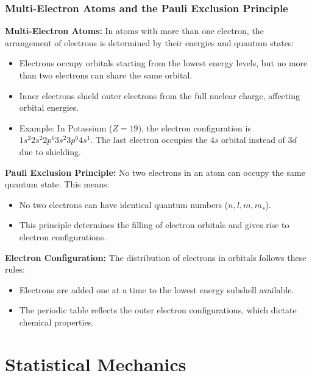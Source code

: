 \documentclass{article}
\newcommand{\conceptbox}[1]{\begin{tcolorbox}[colback=blue!10] #1 \end{tcolorbox}}
\begin{document}
\subsubsection{Multi-Electron Atoms and the Pauli Exclusion Principle}

\conceptbox{
\textbf{Multi-Electron Atoms:}
In atoms with more than one electron, the arrangement of electrons is determined by their energies and quantum states:
\begin{itemize}
    \item Electrons occupy orbitals starting from the lowest energy levels, but no more than two electrons can share the same orbital.
    \item Inner electrons shield outer electrons from the full nuclear charge, affecting orbital energies.
    \item Example: In Potassium (\( Z = 19 \)), the electron configuration is \( 1s^2 2s^2 2p^6 3s^2 3p^6 4s^1 \). The last electron occupies the \( 4s \) orbital instead of \( 3d \) due to shielding.
\end{itemize}
}

\conceptbox{
\textbf{Pauli Exclusion Principle:}
No two electrons in an atom can occupy the same quantum state. This means:
\begin{itemize}
    \item No two electrons can have identical quantum numbers (\( n, l, m, m_s \)).
    \item This principle determines the filling of electron orbitals and gives rise to electron configurations.
\end{itemize}
}

\conceptbox{
\textbf{Electron Configuration:}
The distribution of electrons in orbitals follows these rules:
\begin{itemize}
    \item Electrons are added one at a time to the lowest energy subshell available.
    \item The periodic table reflects the outer electron configurations, which dictate chemical properties.
\end{itemize}
}

\section{Statistical Mechanics}
\end{document}
